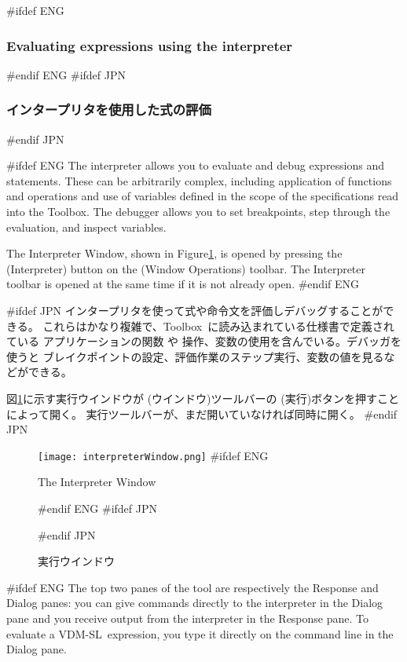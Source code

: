 \documentclass[\pformat,12pt]{article}
\newcommand{\vdmslpp}{VDM-SL}
\newcommand{\Toolbox}{Toolbox}
\newcommand{\vdmslpp}{VDM++}
\newcommand{\Toolbox}{Toolbox}
\newcommand{\guicmd}[1]{{\sf #1}}
\newcommand{\guicmd}[1]{{\gt #1}}
\begin{document}
#ifdef ENG
\subsubsection{Evaluating expressions using the interpreter}
\label{interpreter}
#endif ENG
#ifdef JPN
\subsubsection{インタープリタを使用した式の評価}
\label{interpreter}
#endif JPN

#ifdef ENG
The interpreter allows you to evaluate and debug expressions and
statements.  These can be arbitrarily complex, including application
of functions and operations and use of variables defined in the scope
of the specifications read into the \Toolbox.  The debugger allows you
to set breakpoints, step through the evaluation, and inspect variables.

The \guicmd{Interpreter Window}, shown in
Figure\ref{fig:interpwin}, is opened by pressing the 
(\guicmd{Interpreter}) button on the (\guicmd{Window Operations})
toolbar. The \guicmd{Interpreter} toolbar is opened at the same
time if it is not already open.
#endif ENG

#ifdef JPN
インタープリタを使って式や命令文を評価しデバッグすることができる。
これらはかなり複雑で、\Toolbox\ に読み込まれている仕様書で定義されている
アプリケーションの関数 や 操作、変数の使用を含んでいる。デバッガを使うと
ブレイクポイントの設定、評価作業のステップ実行、変数の値を見るなどができる。

図\ref{fig:interpwin}に示す\guicmd{実行ウインドウ}が
(\guicmd{ウインドウ})ツールバーの  
(\guicmd{実行})ボタンを押すことによって開く。
\guicmd{実行}ツールバーが、まだ開いていなければ同時に開く。
#endif JPN


\begin{figure}[tbh]
\begin{center}
\texttt{[image: interpreterWindow.png]}
#ifdef ENG
\caption{The Interpreter Window}
#endif ENG
#ifdef JPN
\caption{実行ウインドウ}
#endif JPN
\label{fig:interpwin}
\end{center}
\end{figure}

#ifdef ENG
The top two panes of the tool are respectively the
\guicmd{Response} and \guicmd{Dialog} panes: you
can give commands directly to the interpreter in the
\guicmd{Dialog} pane and you receive output from the
interpreter in the \guicmd{Response} pane. To evaluate a \vdmslpp\
expression, you type it directly on the command line in the
\guicmd{Dialog} pane.
\end{document}
